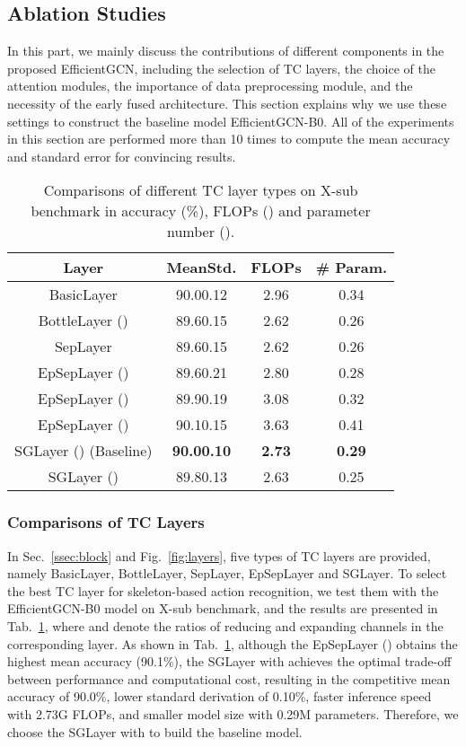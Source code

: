 \documentclass[10pt,journal,compsoc]{IEEEtran}
\begin{document}
\subsection{Ablation Studies}
\label{ssec:ablation}

In this part, we mainly discuss the contributions of different components in the proposed EfficientGCN, including the selection of TC layers, the choice of the attention modules, the importance of data preprocessing module, and the necessity of the early fused architecture. This section explains why we use these settings to construct the baseline model EfficientGCN-B0. All of the experiments in this section are performed more than 10 times to compute the mean accuracy and standard error for convincing results.

\begin{table}[t]
  \caption{Comparisons of different TC layer types on X-sub benchmark in accuracy (\%), FLOPs () and parameter number ().}
  \label{tab:layer}
  \vspace{-0.4cm}
  \centering
  \setlength{\tabcolsep}{4pt}
  \renewcommand{\arraystretch}{1.2}
  \begin{tabular}{c|ccc}
  \toprule
  Layer & MeanStd. & FLOPs & \# Param.\\
  \midrule
  BasicLayer & 90.00.12 & 2.96 & 0.34 \\
  \midrule
  BottleLayer () & 89.60.15 & 2.62 & 0.26 \\
  \midrule
  SepLayer & 89.60.15 & 2.62 & 0.26 \\
  \midrule
  EpSepLayer () & 89.60.21 & 2.80 & 0.28 \\
  EpSepLayer () & 89.90.19 & 3.08 & 0.32 \\
  EpSepLayer () & 90.10.15 & 3.63 & 0.41 \\
  \midrule
  SGLayer () (Baseline) & {\bf 90.00.10} & {\bf 2.73} & {\bf 0.29} \\
  SGLayer () & 89.80.13 & 2.63 & 0.25 \\
  \bottomrule
  \end{tabular}
\end{table}

\subsubsection{Comparisons of TC Layers}
\label{sssec:compare_layer}

In Sec.~\ref{ssec:block} and Fig.~\ref{fig:layers}, five types of TC layers are provided, namely BasicLayer, BottleLayer, SepLayer, EpSepLayer and SGLayer. To select the best TC layer for skeleton-based action recognition, we test them with the EfficientGCN-B0 model on X-sub benchmark, and the results are presented in Tab.~\ref{tab:layer}, where  and  denote the ratios of reducing and expanding channels in the corresponding layer. As shown in Tab.~\ref{tab:layer}, although the EpSepLayer () obtains the highest mean accuracy (90.1\%), the SGLayer with  achieves the optimal trade-off between performance and computational cost, resulting in the competitive mean accuracy of 90.0\%, lower standard derivation of 0.10\%, faster inference speed with 2.73G FLOPs, and smaller model size with 0.29M parameters. Therefore, we choose the SGLayer with  to build the baseline model.
\end{document}
